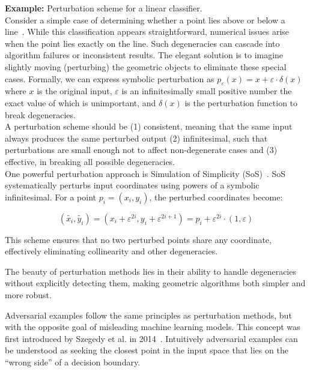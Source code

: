 \documentclass[a4paper, oneside]{discothesis}
\begin{document}
\begin{examplebox}
	\textbf{Example:} Perturbation scheme for a linear classifier. \\

	Consider a simple case of determining whether a point lies above or below a line~\cite{de2000computational}. While this classification appears straightforward, numerical issues arise when the point lies exactly on the line. Such degeneracies can cascade into algorithm failures or inconsistent results. The elegant solution is to imagine slightly moving (perturbing) the geometric objects to eliminate these special cases. Formally, we can express symbolic perturbation as $p_\varepsilon(x) = x + \varepsilon \cdot \delta(x)$ where $x$ is the original input, $\varepsilon$ is an infinitesimally small positive number the exact value of which is unimportant, and $\delta(x)$ is the perturbation function to break degeneracies. \\

	A perturbation scheme should be (1) consistent, meaning that the same input always produces the same perturbed output (2) infinitesimal, such that perturbations are small enough not to affect non-degenerate cases and (3) effective, in breaking all possible degeneracies. \\

	One powerful perturbation approach is Simulation of Simplicity (SoS)~\cite{franklin2022implementing, edelsbrunner2002topological, edelsbrunner2001sink, edelsbrunner1990simulation, levy2016robustness, schorn1993axiomatic}. SoS systematically perturbs input coordinates using powers of a symbolic infinitesimal. For a point $p_i = (x_i, y_i)$, the perturbed coordinates become:

	$$(\tilde{x_i}, \tilde{y_i}) = (x_i + \varepsilon^{2i}, y_i + \varepsilon^{2i+1}) = p_i + \varepsilon^{2i} \cdot (1, \varepsilon)$$

	This scheme ensures that no two perturbed points share any coordinate, effectively eliminating collinearity and other degeneracies.
\end{examplebox}

The beauty of perturbation methods lies in their ability to handle degeneracies without explicitly detecting them, making geometric algorithms both simpler and more robust.

Adversarial examples follow the same principles as perturbation methods, but with the opposite goal of misleading machine learning models. This concept was first introduced by Szegedy et al. in 2014~\cite{szegedy2013intriguing}. Intuitively adversarial examples can be understood as seeking the closest point in the input space that lies on the ``wrong side'' of a decision boundary.
\end{document}
